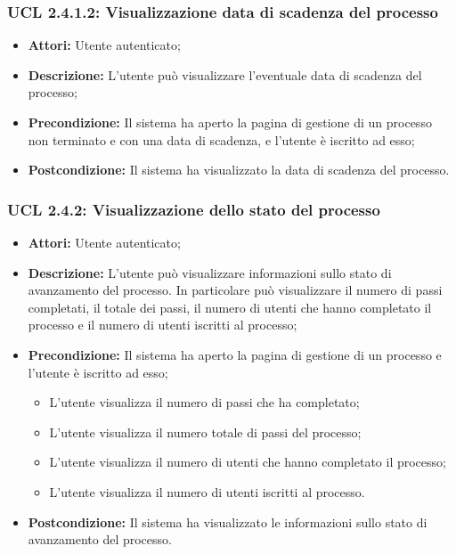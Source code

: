 \hypertarget{L2.4.1.2}{}
\subsubsection{UCL 2.4.1.2: Visualizzazione data di scadenza del processo}
\begin{itemize}
\item \textbf{Attori:} Utente autenticato;
\item \textbf{Descrizione:} L'utente può visualizzare l'eventuale data di scadenza del processo;
\item \textbf{Precondizione:} Il sistema ha aperto la pagina di gestione di un processo  non terminato e con una data di scadenza, e l'utente è iscritto ad esso;
\item \textbf{Postcondizione:} Il sistema ha visualizzato la data di scadenza del processo.
\end{itemize}

\hypertarget{L2.4.2}{}
\subsubsection{UCL 2.4.2: Visualizzazione dello stato del processo}
\begin{itemize}
\item \textbf{Attori:} Utente autenticato;
\item \textbf{Descrizione:} L'utente può visualizzare informazioni sullo stato di avanzamento del processo. In particolare può visualizzare il numero di passi completati, il totale dei passi, il numero di utenti che hanno completato il processo e il numero di utenti iscritti al processo;
\item \textbf{Precondizione:} Il sistema ha aperto la pagina di gestione di un processo e l'utente è iscritto ad esso;
\begin{itemize}
\item L'utente visualizza il numero di passi che ha completato;
\item L'utente visualizza il numero totale di passi del processo;
\item L'utente visualizza il numero di utenti che hanno completato il processo;
\item L'utente visualizza il numero di utenti iscritti al processo.
\end{itemize}
\item \textbf{Postcondizione:} Il sistema ha visualizzato le informazioni sullo stato di avanzamento del processo.
\end{itemize}

